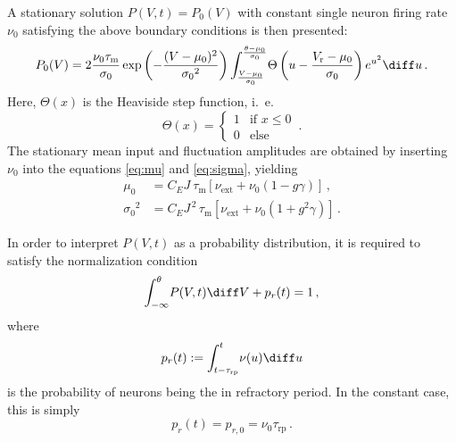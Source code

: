 A stationary solution $P(V, t) = P_0(V)$ with constant 
single neuron firing rate $\nu_0$ 
satisfying the above boundary conditions is then presented:
\begin{equation}
    P_0(V) = 2 \frac{\nu_0 \tau_\text{m}}{\sigma_0} 
        \exp{\left(- \frac{(V - \mu_0)^2}{{\sigma_0}^2} \right)}
        \int_{\frac{V - \mu_0}{\sigma_0}}^{\frac{\theta - \mu_0}{\sigma_0}} \! 
            \Theta \left(u - \frac{V_\text{r} - \mu_0}{\sigma_0} \right) e^{u^2} \diff u  \,. 
    \label{eq:P_V_0}
\end{equation}
Here, $\Theta(x)$ is the Heaviside step function, i.~e. 
\begin{equation}
    \Theta(x) = \begin{cases} 1 & \text{if } x \le 0 \\ 0 & \text{else } \end{cases}  \,.
    \label{eq:heaviside}
\end{equation}
The stationary mean input and fluctuation amplitudes are obtained by inserting 
$\nu_0$ into the equations \eqref{eq:mu} and \eqref{eq:sigma}, yielding 
\begin{align}
    \mu_0 	    &= C_E J \:\tau_\text{m} [\nu_\text{ext} + \nu_0(1 - g \gamma)]  \,, \\ 
    {\sigma_0}^2 	&= C_E J^{\,2} \,\tau_\text{m} [\nu_\text{ext} + \nu_0(1 + g^2 \gamma)] \,.
    \label{eq:mu_sigma_0}
\end{align}

In order to interpret $P(V, t)$ as a probability distribution, it is required to
satisfy the normalization condition
\begin{equation}
    \int_{-\infty}^{\theta} \! P(V, t) \diff V  + p_r(t) = 1 \, ,
    \label{eq:P_V_prob}
\end{equation}
where 
\begin{equation}
    p_r(t) := \int_{t - \tau_\text{rp}}^{t} \! \nu(u) \diff u 
    \label{eq:p_r}
\end{equation}
is the probability of neurons being the in refractory period.
In the constant case, this is simply 
\begin{equation}
    p_r(t) = p_{r, 0} = \nu_0 \tau_\text{rp}  \,.
    \label{eq:p_r_0}
\end{equation}

